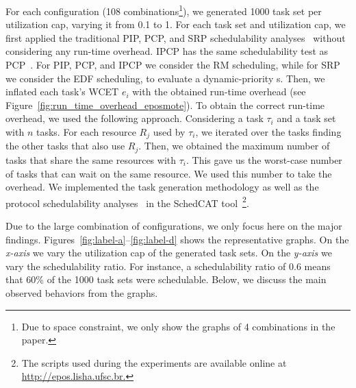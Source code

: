 For each configuration (108 combinations\footnote{Due to space constraint, 
we only show the graphs of 4 combinations in the paper.}), we generated 1000 
task set per utilization cap, varying it from 0.1 to 1. For each task set and 
utilization cap, we first applied the traditional PIP, PCP, and SRP 
schedulability analyses~\cite{Buttazzo:2011} without considering any run-time 
overhead. IPCP has the same schedulability test as PCP~\cite{Buttazzo:2011}. For 
PIP, PCP, and IPCP we consider the RM scheduling, while for SRP we consider the 
EDF scheduling, to evaluate a dynamic-priority s. Then, we inflated each task's WCET $e_i$ with the obtained 
run-time overhead (see Figure~\ref{fig:run_time_overhead_eposmote}). To obtain 
the correct run-time overhead, we used the following approach. Considering a 
task 
$\tau_i$ and a task set with $n$ tasks. For each resource $R_j$ used by 
$\tau_i$, we iterated over the tasks finding the other tasks that also use 
$R_j$. Then, we obtained the maximum number of tasks that share the same 
resources with $\tau_i$. This gave us the worst-case number of tasks that can 
wait on the same resource. We used this number to take the overhead. We 
implemented the task generation methodology as well as the protocol 
schedulability analyses~\cite{Buttazzo:2011} in the SchedCAT 
tool~\cite{schedcat}\footnote{The scripts used during the experiments are 
available online at \url{http://epos.lisha.ufsc.br.}}. 

Due to the large combination of configurations, we only focus here on the major 
findings. Figures~\ref{fig:label-a}--\ref{fig:label-d} shows the representative 
graphs. On the \emph{x-axis} we vary the utilization cap of the generated task 
sets. On the \emph{y-axis} we vary the schedulability ratio. For instance, a 
schedulability ratio of 0.6 means that 60\% of the 1000 task sets were 
schedulable. Below, we discuss the main observed behaviors from the graphs.

